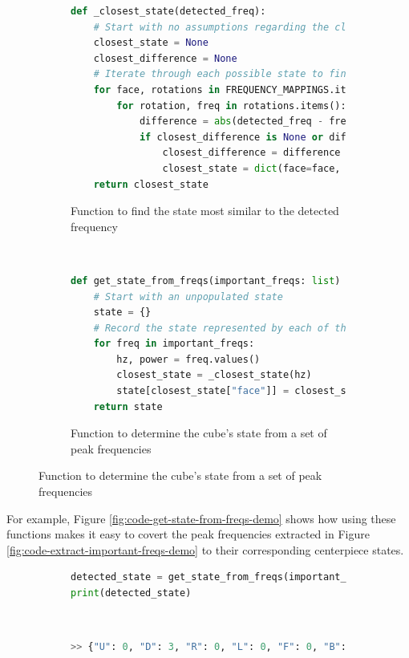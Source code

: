 \begin{figure}[h]
\caption{Converting peak frequencies to centerpiece states}
\label{fig:code-convert-peak-freqs-to-state}
\begin{subfigure}{\textwidth}
\caption{Function to find the state most similar to the detected frequency}
\label{fig:code-closest-state}
\begin{lstlisting}[language=Python]
def _closest_state(detected_freq):
    # Start with no assumptions regarding the closest state
    closest_state = None
    closest_difference = None
    # Iterate through each possible state to find the closest one
    for face, rotations in FREQUENCY_MAPPINGS.items():
        for rotation, freq in rotations.items():
            difference = abs(detected_freq - freq)
            if closest_difference is None or difference < closest_difference:
                closest_difference = difference
                closest_state = dict(face=face, rotation=rotation)
    return closest_state
\end{lstlisting}
\end{subfigure}\\

\begin{subfigure}{\textwidth}
\caption{Function to determine the cube's state from a set of peak frequencies}
\label{fig:code-get-state-from-freqs} 
\begin{lstlisting}[language=Python, firstnumber=last]
def get_state_from_freqs(important_freqs: list) -> dict:
    # Start with an unpopulated state
    state = {}
    # Record the state represented by each of the peak frequencies
    for freq in important_freqs:
        hz, power = freq.values()
        closest_state = _closest_state(hz)
        state[closest_state["face"]] = closest_state["rotation"]
    return state
\end{lstlisting}
\end{subfigure}
\end{figure}

For example, Figure \ref{fig:code-get-state-from-freqs-demo} shows how
using these functions makes it easy to covert the peak frequencies
extracted in Figure \ref{fig:code-extract-important-freqs-demo} to
their corresponding centerpiece states.

\begin{figure}[h]
\caption{Example conversion of peak frequencies to states}
\label{fig:code-get-state-from-freqs-demo} 
\begin{subfigure}{\textwidth}
\begin{lstlisting}[language=Python]
detected_state = get_state_from_freqs(important_freqs)
print(detected_state)
\end{lstlisting}
\end{subfigure}\\

\begin{subfigure}{\textwidth}
\begin{lstlisting}[language=Python, numbers=none]
>> {"U": 0, "D": 3, "R": 0, "L": 0, "F": 0, "B": 0}
\end{lstlisting}
\end{subfigure}
\end{figure}


